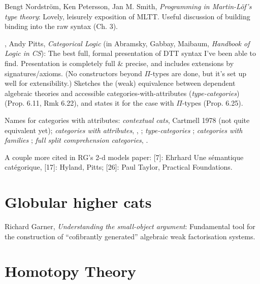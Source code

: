 \documentclass{article}
\begin{document}
\cite{n-p-s:programming} Bengt Nordstr\"o{}m, Ken Petersson, Jan M. Smith, \emph{Programming in Martin-L\"o{}f's type theory}: Lovely, leisurely exposition of MLTT.  Useful discussion of building binding into the raw syntax (Ch. 3).

\cite{pitts:categorical-logic}, Andy Pitts, \emph{Categorical Logic} (in Abramsky, Gabbay, Maibaum, \emph{Handbook of Logic in CS}): The best full, formal presentation of DTT syntax I've been able to find.  Presentation is completely full \& precise, and includes extensions by signatures/axioms.  (No constructors beyond $\Pi$-types are done, but it's set up well for extensibility.)  Sketches the (weak) equivalence between dependent algebraic theories and accessible categories-with-attributes (\emph{type-categories}) (Prop. 6.11, Rmk 6.22), and states it for the case with $\Pi$-types (Prop. 6.25).

Names for categories with attributes: \emph{contextual cats}, Cartmell 1978 (not quite equivalent yet); \emph{categories with attributes}, \cite{hofmann:lcccs}, \cite{hofmann:syntax-and-semantics}; \emph{type-categories} \cite{pitts:categorical-logic}; \emph{categories with families} \cite{dybjer:internal-type-theory}; \emph{full split comprehension categories}, \cite[4.10]{jacobs:comprehension-categories}.

A couple more cited in RG's 2-d models paper: [7]: Ehrhard Une sémantique catégorique, [17]: Hyland, Pitts; [26]: Paul Taylor, Practical Foundations.

\section{Globular higher cats}

\cite{garner:understanding} Richard Garner, \emph{Understanding the small-object argument}:  Fundamental tool for the construction of ``cofibrantly generated'' algebraic weak factorisation systems.


\section{Homotopy Theory}



\end{document}
